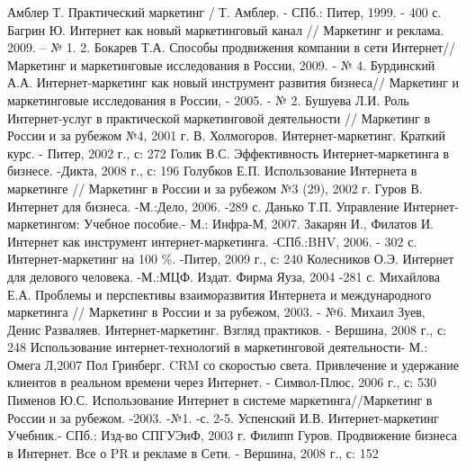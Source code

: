 \documentclass[a4paper,english,russian]{G2-105}
\begin{document}
\newpage
\begin{thebibliography}{1}
	 Амблер Т. Практический маркетинг / Т. Амблер. - СПб.: Питер, 1999. - 400 с.
 Багрин Ю. Интернет как новый маркетинговый канал // Маркетинг и реклама. 2009. -- № 1. 2.
 Бокарев Т.А. Способы продвижения компании в сети Интернет// Маркетинг и маркетинговые исследования в России, 2009. - № 4.
 Бурдинский А.А. Интернет-маркетинг как новый инструмент развития бизнеса// Маркетинг и маркетинговые исследования в России, - 2005. - № 2.
 Бушуева Л.И. Роль Интернет-услуг в практической маркетинговой деятельности // Маркетинг в России и за рубежом №4, 2001 г.
 В. Холмогоров. Интернет-маркетинг. Краткий курс. - Питер, 2002 г., с: 272
 Голик В.С. Эффективность Интернет-маркетинга в бизнесе. -Дикта, 2008 г., с: 196
 Голубков Е.П. Использование Интернета в маркетинге // Маркетинг в России и за рубежом №3 (29), 2002 г.
 Гуров В. Интернет для бизнеса. -М.:Дело, 2006. -289 с.
 Данько Т.П. Управление Интернет-маркетингом: Учебное пособие.- М.: Инфра-М, 2007.
 Закарян И., Филатов И. Интернет как инструмент интернет-маркетинга. -СПб.:BHV, 2006. - 302 с.
 Интернет-маркетинг на 100 \%. -Питер, 2009 г., с: 240
 Колесников О.Э. Интернет для делового человека. -М.:МЦФ. Издат. Фирма Яуза, 2004 -281 с.
 Михайлова Е.А. Проблемы и перспективы взаиморазвития Интернета и международного маркетинга // Маркетинг в России и за рубежом, 2003. - №6.
 Михаил Зуев, Денис Разваляев. Интернет-маркетинг. Взгляд практиков. - Вершина, 2008 г., с: 248
 Использование интернет-технологий в маркетинговой деятельности- М.: Омега Л,2007
 Пол Гринберг. CRM со скоростью света. Привлечение и удержание клиентов в реальном времени через Интернет. - Символ-Плюс, 2006 г., с: 530
 Пименов Ю.С. Использование Интернет в системе маркетинга//Маркетинг в России и за рубежом. -2003. -№1. -с. 2-5.
 Успенский И.В. Интернет-маркетинг Учебник.- СПб.: Изд-во СПГУЭиФ, 2003 г.
 Филипп Гуров. Продвижение бизнеса в Интернет. Все о PR и рекламе в Сети. - Вершина, 2008 г., с: 152
\end{thebibliography}
\end{document}
